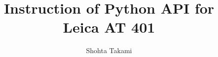 \documentclass[a4paper,12pt]{article}  %
\title{Instruction of Python API for Leica AT 401}
\author{Shohta Takami}
\begin{document}
\maketitle

\end{document}
